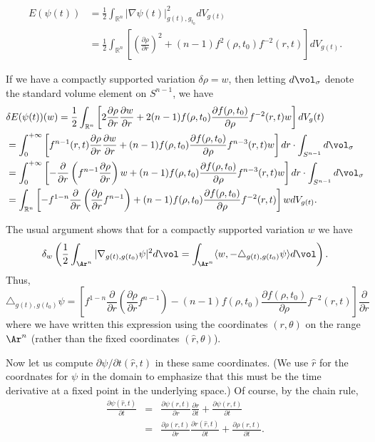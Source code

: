 \begin{align*}
E(\psi(t)) & = \frac{1}{2} \int_{\mathbb{R}^n} \left \vert \nabla
\psi(t)
\right \vert^2_{g(t),g_{t_0}} dV_{g(t)}  \\
&= \frac{1}{2} \int_{\mathbb{R}^n} \left[ \left( \frac{\partial
\rho}{\partial r} \right)^2 + (n-1) f^2(\rho,t_0) f^{-2}(r,t)
\right] dV_{g(t)}.
\end{align*}

If we have a compactly supported variation $\delta \rho =w$, then
letting $d\vol_\sigma$ denote the standard volume element on
$S^{n-1}$, we have
\begin{align*}
& \delta E(\psi(t))(w) = \frac{1}{2} \int_{\mathbb{R}^n} \left[2
\frac{\partial \rho}{\partial r} \frac{\partial w}{\partial r}
+2(n-1) f(\rho,t_0)
\frac{\partial f(\rho,t_0)}{\partial \rho}f^{-2}(r,t)w \right] dV_g(t) \\
&= \int_0^{+\infty} \left[  f^{n-1}(r,t)\frac{\partial
\rho}{\partial r} \frac{\partial w}{\partial r} +(n-1) f(\rho,t_0)
\frac{\partial f(\rho,t_0)}{\partial
\rho}f^{n-3}(r,t)w \right] dr \cdot \int_{S^{n-1}} d\vol_\sigma \\
& = \int_0^{+\infty} \left[-\frac{\partial}{\partial
r}\left(f^{n-1}\frac{\partial\rho}{\partial r}\right)w+(n-1)
f(\rho,t_0) \frac{\partial f(\rho,t_0)}{\partial \rho}f^{n-3}(r,t)w
\right] dr \cdot \int_{S^{n-1}} d\vol_\sigma\\ &=
\int_{\mathbb{R}^n}\left[ - f^{1-n} \frac{\partial }{\partial r}
\left( \frac{\partial \rho}{\partial r} f^{n-1}\right) +(n-1)
f(\rho,t_0) \frac{\partial f(\rho,t_0)}{\partial \rho}f^{-2}(r,t)
\right] w dV_{g(t)}.
\end{align*}



The usual argument shows that for a compactly supported variation
$w$ we have
$$\delta_w\left(\frac{1}{2}\int_{\Ar^n}|\nabla_{g(t),g(t_0)}\psi|^2d\vol=\int_{\Ar^n}\langle
w,-\triangle_{g(t),g(t_0)}\psi\rangle d\vol\right).$$ Thus,
$$\triangle_{g(t),g(t_0)}\psi= \left[
f^{1-n}\frac{\partial }{\partial r} \left( \frac{\partial
\rho}{\partial r} f^{n-1}\right) -(n-1) f(\rho,t_0) \frac{\partial
f(\rho,t_0)}{\partial \rho}f^{-2}(r,t) \right]
\frac{\partial}{\partial r}$$ where we have written this expression
using the coordinates $(r,\theta)$ on the range $\Ar ^n$ (rather
than the fixed coordinates $(\hat r,\theta)$).

Now let us compute $\partial \psi/\partial t(\hat r,t)$ in these
same coordinates. (We use $\hat r$ for the coordnates for $\psi$ in
the domain to emphasize that this must be the time derivative at a
fixed point in the underlying space.) Of course, by the chain  rule,
\begin{eqnarray*}
\frac{\partial \psi(\hat r,t)}{\partial t} & = & \frac{\partial
\psi(r,t)}{\partial r}\frac{\partial r}{\partial t}+\frac{\partial
\psi(r,t)}{\partial t} \\
& = & \frac{\partial \rho(r,t)}{\partial r}\frac{\partial r(\hat
r,t)}{\partial t}+\frac{\partial \rho(r,t)}{\partial
t}.\end{eqnarray*}




